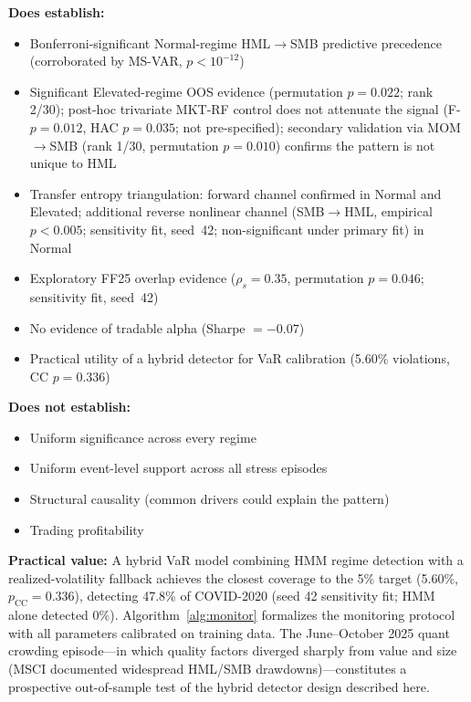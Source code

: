 \documentclass[sigconf,anonymous]{acmart}
\begin{document}
\textbf{Does establish:}
\begin{itemize}
    \item Bonferroni-significant Normal-regime HML$\to$SMB predictive precedence
    (corroborated by MS-VAR, $p < 10^{-12}$)
    \item Significant Elevated-regime OOS evidence (permutation $p = 0.022$; rank 2/30); post-hoc trivariate MKT-RF control
    does not attenuate the signal (F-$p = 0.012$, HAC $p = 0.035$; not pre-specified); secondary validation via MOM$\to$SMB
    (rank 1/30, permutation $p = 0.010$) confirms the pattern is not unique to HML
    \item Transfer entropy triangulation: forward channel confirmed in Normal and Elevated;
    additional reverse nonlinear channel (SMB$\to$HML, empirical $p < 0.005$; sensitivity fit, seed~42;
    non-significant under primary fit) in Normal
    \item Exploratory FF25 overlap evidence ($\rho_s = 0.35$, permutation $p = 0.046$; sensitivity fit, seed~42)
    \item No evidence of tradable alpha (Sharpe $= -0.07$)
    \item Practical utility of a hybrid detector for VaR calibration
    (5.60\% violations, CC $p = 0.336$)
\end{itemize}

\textbf{Does not establish:}
\begin{itemize}
    \item Uniform significance across every regime
    \item Uniform event-level support across all stress episodes
    \item Structural causality (common drivers could explain the pattern)
    \item Trading profitability
\end{itemize}

\textbf{Practical value:} A hybrid VaR model combining HMM regime detection
with a realized-volatility fallback achieves the closest coverage to the 5\%
target (5.60\%, $p_{\text{CC}} = 0.336$), detecting 47.8\% of COVID-2020
(seed 42 sensitivity fit; HMM alone detected 0\%). Algorithm~\ref{alg:monitor} formalizes
the monitoring protocol with all parameters calibrated on training data.
The June--October 2025 quant crowding episode---in which quality factors diverged
sharply from value and size (MSCI documented widespread HML/SMB drawdowns)---constitutes
a prospective out-of-sample test of the hybrid detector design described here.
\end{document}
